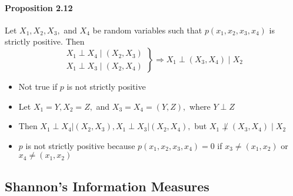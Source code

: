 \documentclass[8pt]{article}
\begin{document}
\paragraph{Proposition 2.12} Let $X_{1}, X_{2}, X_{3},$ and $X_{4}$ be random variables such that $p\left(x_{1}, x_{2}, x_{3}, x_{4}\right)$ is strictly positive. Then
$$
\left.\begin{array}{l}
X_{1} \perp X_{4} \mid\left(X_{2}, X_{3}\right) \\
X_{1} \perp X_{3} \mid\left(X_{2}, X_{4}\right)
\end{array}\right\} \Rightarrow X_{1} \perp\left(X_{3}, X_{4}\right) \mid X_{2}
$$
\begin{itemize}
	\item Not true if $p$ is not strictly positive
	\item Let $X_{1}=Y, X_{2}=Z,$ and $X_{3}=X_{4}=(Y, Z),$ where $Y \perp Z$
	\item Then $X_{1} \perp X_{4}\left|\left(X_{2}, X_{3}\right), X_{1} \perp X_{3}\right|\left(X_{2}, X_{4}\right),$ but $X_{1} \not \perp\left(X_{3}, X_{4}\right) \mid X_{2}$
	\item $p$ is not strictly positive because $p\left(x_{1}, x_{2}, x_{3}, x_{4}\right)=0$ if $x_{3} \neq\left(x_{1}, x_{2}\right)$ or $x_{4} \neq\left(x_{1}, x_{2}\right)$
\end{itemize}

\subsection{Shannon’s Information Measures}
\end{document}
